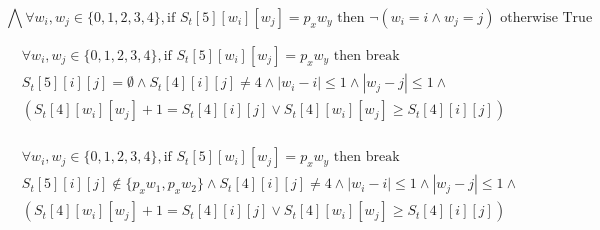 \documentclass{telkomnika}
\begin{document}
\begin{equation}
\bigwedge\forall w_i, w_j \in \{0,1,2,3,4\},\text{if } S_t[5][w_i][w_j] = p_x w_y 
    \text{ then } \neg(w_i=i \land w_j=j) \text{ otherwise True}
    \label{eq:chk_worker_pos}
\end{equation}

\begin{equation}
 \begin{aligned}
    &\forall w_i, w_j \in \{0,1,2,3,4\},\text{if } S_t[5][w_i][w_j] = p_x w_y \text{ then break}\\
    &S_t[5][i][j]=\emptyset \land S_t[4][i][j]\neq 4 \land |w_i-i|\leq 1 \land |w_j-j| \leq 1 \land\\
    &(S_t[4][w_i][w_j]+1=S_t[4][i][j] \vee S_t[4][w_i][w_j] \geq S_t[4][i][j] )\\
 \end{aligned}
\label{eq:chk_worker_move}
\end{equation}

\begin{equation}
 \begin{aligned}
    &\forall w_i, w_j \in \{0,1,2,3,4\},\text{if } S_t[5][w_i][w_j] = p_x w_y \text{ then break}\\
    &S_t[5][i][j]\notin \{p_xw_1,p_xw_2\} \land S_t[4][i][j]\neq 4 \land |w_i-i|\leq 1 \land |w_j-j| \leq 1 \land\\
    &(S_t[4][w_i][w_j]+1=S_t[4][i][j] \vee S_t[4][w_i][w_j] \geq S_t[4][i][j] )\\
 \end{aligned}
\label{eq:chk_worker_appolo}
\end{equation}
\end{document}
